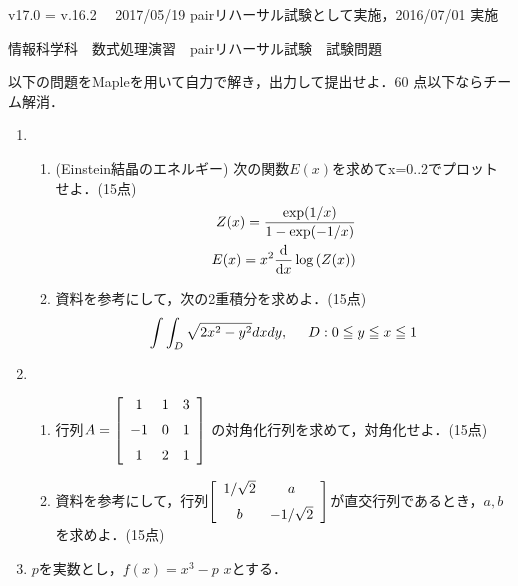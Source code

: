 \documentclass[12pt,a4j]{jarticle}
\begin{document}
\small{v17.0  = v.16.2}　
\hfill\small{2017/05/19 pairリハーサル試験として実施，2016/07/01 実施}
\begin{center}
{\gt\large{情報科学科　数式処理演習　pairリハーサル試験　試験問題}}
\end{center}
\vspace{5mm}

以下の問題をMapleを用いて自力で解き，出力して提出せよ．60 点以下ならチーム解消．

\begin{enumerate}

\item 
\begin{enumerate}
\item 
(Einstein結晶のエネルギー) 次の関数$E(x)$を求めてx=0..2でプロットせよ．(15点)
\begin{align*}
Z(x) = \frac{\exp(1/x)}{1-\exp(-1/x)} \\
E(x) = x^2 \frac{\rm d}{{\rm d}x} \log \left(Z(x)\right)
\end{align*}

\item
資料を参考にして，次の2重積分を求めよ．(15点)
\begin{equation*}
\int \int_D \sqrt{2x^2-y^2}dxdy,\hspace{5mm} D:0\leqq y \leqq x \leqq 1 
\end{equation*}

\end{enumerate}

\item 
\begin{enumerate}
\item 
行列$\displaystyle A= 
\left[ \begin {array}{ccc} 
1&1&3\\ 
\noalign{\medskip}-1&0&1\\ 
\noalign{\medskip}1&2&1
\end {array} \right] $
の対角化行列を求めて，対角化せよ．(15点)
\item
資料を参考にして，行列$\displaystyle  
\left[ \begin {array}{cc} 
1/\sqrt{2}&a\\ 
\noalign{\medskip}b&-1/\sqrt{2}
\end {array} \right] $が直交行列であるとき，$a,b$を求めよ．(15点)

\end{enumerate}


\item 
$p$を実数とし，$f(x)=x^3-p\,\, x$とする．


\end{enumerate}
\end{document}
